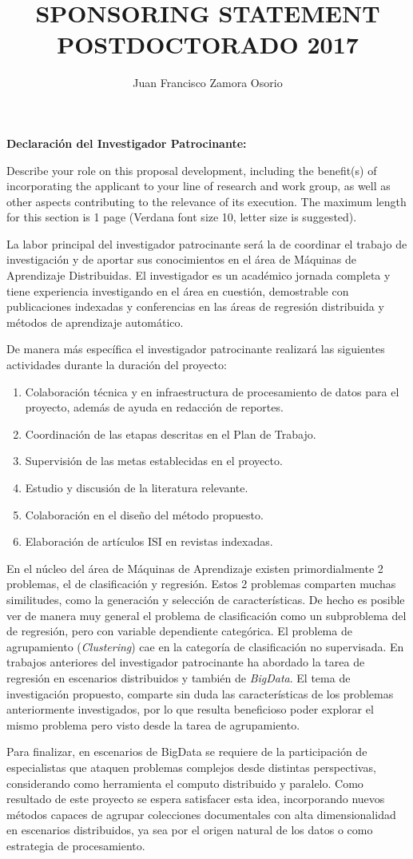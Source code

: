 \documentclass[10pt]{article}
\author{Juan Francisco Zamora Osorio}
\title{SPONSORING STATEMENT POSTDOCTORADO 2017}
\begin{document}
\noindent \textbf{Declaración del Investigador Patrocinante:}

\vspace{15pt}
\noindent Describe your role on this proposal development, including the benefit(s) of incorporating the applicant to your line of research and work group, as well as other aspects contributing to the relevance of its execution. The maximum length for this section is 1 page (Verdana font size 10, letter size is suggested).

La labor principal del investigador patrocinante será la de coordinar el trabajo de investigación y de aportar sus conocimientos en el área de M\'aquinas de Aprendizaje Distribuidas. El investigador es un académico jornada completa y tiene experiencia investigando en el área en cuesti\'on, demostrable con publicaciones indexadas y conferencias en las áreas de regresi\'on distribuida y métodos de aprendizaje automático. 

De manera m\'as espec\'ifica el investigador patrocinante realizar\'a las siguientes actividades durante la duraci\'on del proyecto:
\begin{enumerate}
\item Colaboraci\'on t\'ecnica y en infraestructura de procesamiento de datos para el proyecto, además de ayuda en redacci\'on de reportes.
\item Coordinaci\'on de las etapas descritas en el Plan de Trabajo.
\item Supervisi\'on de las metas establecidas en el proyecto.
\item Estudio y discusi\'on de la literatura relevante.
\item Colaboraci\'on en el dise\~no del m\'etodo propuesto.
\item Elaboraci\'on de art\'iculos ISI en revistas indexadas.
\end{enumerate}

En el núcleo del área de M\'aquinas de Aprendizaje existen primordialmente 2 problemas, el de clasificación y regresión. Estos 2 problemas comparten muchas similitudes, como la generación y selección de características. De hecho es posible ver de manera muy general el problema de clasificaci\'on como un subproblema del de regresión, pero con variable dependiente categórica. El problema de agrupamiento (\emph{Clustering}) cae en la categoría de clasificación no supervisada.
En trabajos anteriores del investigador patrocinante ha abordado la tarea de regresión en escenarios distribuidos y también de \textit{BigData}. El tema de investigación propuesto, comparte sin duda las características de los problemas anteriormente investigados, por lo que resulta beneficioso poder explorar el mismo problema pero visto desde la tarea de agrupamiento. 

Para finalizar, en escenarios de BigData se requiere de la participación de especialistas que ataquen problemas complejos desde distintas perspectivas, considerando como herramienta el computo distribuido y paralelo. Como resultado de este proyecto se espera satisfacer esta idea, incorporando nuevos métodos capaces de agrupar colecciones documentales con alta dimensionalidad en escenarios distribuidos, ya sea por el origen natural de los datos o como estrategia de procesamiento. 
\end{document}
